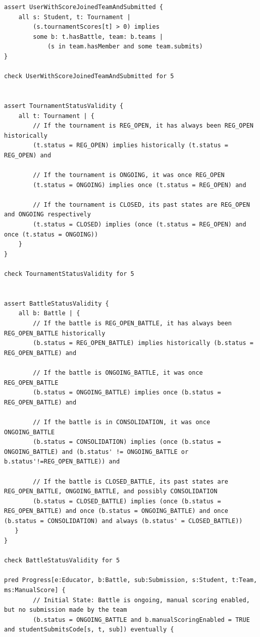 \begin{lstlisting}[language=alloy]
assert UserWithScoreJoinedTeamAndSubmitted {
    all s: Student, t: Tournament | 
        (s.tournamentScores[t] > 0) implies 
        some b: t.hasBattle, team: b.teams | 
            (s in team.hasMember and some team.submits)
}

check UserWithScoreJoinedTeamAndSubmitted for 5 


assert TournamentStatusValidity {
    all t: Tournament | {
        // If the tournament is REG_OPEN, it has always been REG_OPEN historically
        (t.status = REG_OPEN) implies historically (t.status = REG_OPEN) and

        // If the tournament is ONGOING, it was once REG_OPEN
        (t.status = ONGOING) implies once (t.status = REG_OPEN) and

        // If the tournament is CLOSED, its past states are REG_OPEN and ONGOING respectively
        (t.status = CLOSED) implies (once (t.status = REG_OPEN) and once (t.status = ONGOING))
    }
}

check TournamentStatusValidity for 5


assert BattleStatusValidity {
    all b: Battle | {
        // If the battle is REG_OPEN_BATTLE, it has always been REG_OPEN_BATTLE historically
        (b.status = REG_OPEN_BATTLE) implies historically (b.status = REG_OPEN_BATTLE) and

        // If the battle is ONGOING_BATTLE, it was once REG_OPEN_BATTLE
        (b.status = ONGOING_BATTLE) implies once (b.status = REG_OPEN_BATTLE) and

        // If the battle is in CONSOLIDATION, it was once ONGOING_BATTLE
        (b.status = CONSOLIDATION) implies (once (b.status = ONGOING_BATTLE) and (b.status' != ONGOING_BATTLE or b.status'!=REG_OPEN_BATTLE)) and

        // If the battle is CLOSED_BATTLE, its past states are REG_OPEN_BATTLE, ONGOING_BATTLE, and possibly CONSOLIDATION
        (b.status = CLOSED_BATTLE) implies (once (b.status = REG_OPEN_BATTLE) and once (b.status = ONGOING_BATTLE) and once (b.status = CONSOLIDATION) and always (b.status' = CLOSED_BATTLE))
   } 
}

check BattleStatusValidity for 5

pred Progress[e:Educator, b:Battle, sub:Submission, s:Student, t:Team, ms:ManualScore] {
        // Initial State: Battle is ongoing, manual scoring enabled, but no submission made by the team
        (b.status = ONGOING_BATTLE and b.manualScoringEnabled = TRUE and studentSubmitsCode[s, t, sub]) eventually {


\end{lstlisting}
